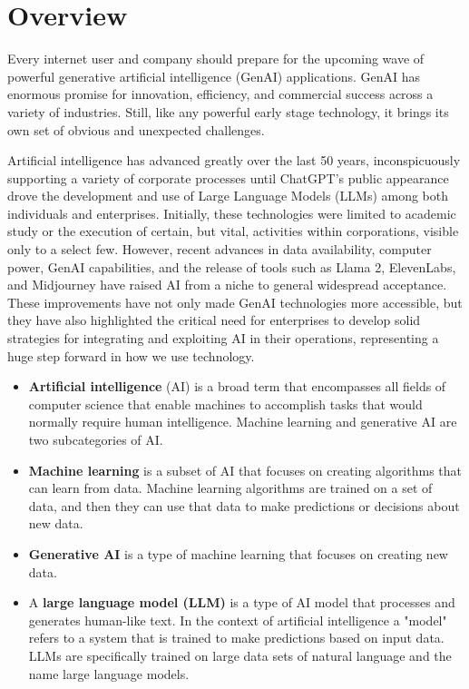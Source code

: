 

\headerimage
\chapter{Overview}
Every internet user and company should prepare for the upcoming wave of
powerful generative artificial intelligence (GenAI) applications. GenAI has
enormous promise for innovation, efficiency, and commercial success across a
variety of industries. Still, like any powerful early stage technology, it
brings its own set of obvious and unexpected challenges.

Artificial intelligence has advanced greatly over the last 50 years,
inconspicuously supporting a variety of corporate processes until ChatGPT's
public appearance drove the development and use of Large Language Models (LLMs)
among both individuals and enterprises. Initially, these technologies were
limited to academic study or the execution of certain, but vital, activities
within corporations, visible only to a select few. However, recent advances in
data availability, computer power, GenAI capabilities, and the release of tools
such as Llama 2, ElevenLabs, and Midjourney have raised AI from a niche to
general widespread acceptance. These improvements have not only made GenAI
technologies more accessible, but they have also highlighted the critical need
for enterprises to develop solid strategies for integrating and exploiting AI
in their operations, representing a huge step forward in how we use technology.

\begin{itemize}
  \item \textbf{Artificial intelligence} (AI) is a broad term that
  encompasses all fields of computer science that enable machines to accomplish
  tasks that would normally require human intelligence. Machine learning and
  generative AI are two subcategories of AI.
  \item \textbf{Machine learning} is a subset of AI that focuses on creating
  algorithms that can learn from data. Machine learning algorithms are trained
  on a set of data, and then they can use that data to make predictions or
  decisions about new data.
  \item \textbf{Generative AI} is a type of machine learning that focuses on
  creating new data.
  \item A \textbf{large language model (LLM)} is a type of AI model that
  processes and generates human-like text. In the context of artificial
  intelligence a "model" refers to a system that is trained to make predictions
  based on input data. LLMs are specifically trained on large data sets of
  natural language and the name large language models.
\end{itemize}

